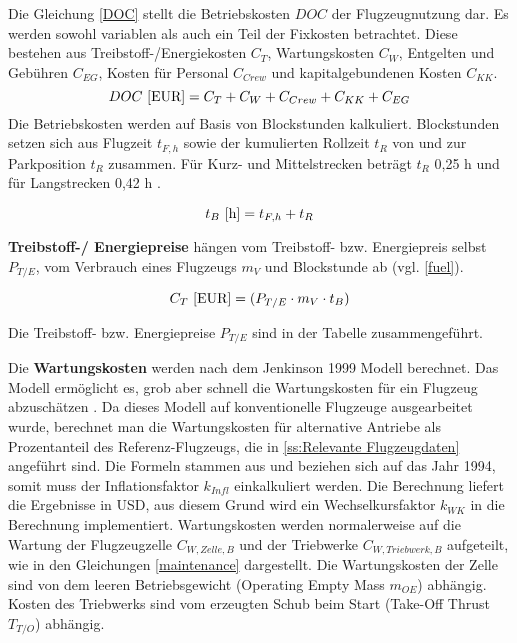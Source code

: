 Die Gleichung \eqref{DOC} stellt die Betriebskosten $DOC$ der Flugzeugnutzung dar. 
Es werden sowohl variablen als auch ein Teil der Fixkosten betrachtet.
Diese bestehen aus Treibstoff-/Energiekosten $C_T$, 
Wartungskosten $C_W$, Entgelten und Gebühren $C_{EG}$, 
Kosten für Personal $C_{Crew}$ und kapitalgebundenen Kosten $C_{KK}$.
%
\begin{equation}
     {DOC ~[\text{EUR}]} = C_T + C_W + C_{Crew} + C_{KK} + C_{EG} \\
     \label{DOC}
  \end{equation}
%
Die Betriebskosten werden auf Basis von Blockstunden kalkuliert. 
Blockstunden setzen sich aus Flugzeit $t_{F,h}$ sowie der kumulierten Rollzeit $t_{R}$ 
von und zur Parkposition $t_{R}$ zusammen. 
Für Kurz- und Mittelstrecken beträgt $t_{R}$ {0,25 h} und für Langstrecken 0,42 h \cite{scholz_design_evaluation_doc}.

\begin{equation}
   t_{B} ~[\text{h}] = t_{F,h} + t_{R} \\
   \label{blockzeit}
\end{equation}

\textbf{Treibstoff-/ Energiepreise} hängen vom Treibstoff- bzw. Energiepreis selbst $P_{T/E}$, 
vom Verbrauch eines Flugzeugs $m_{V}$ und Blockstunde ab (vgl. \eqref{fuel}).

\begin{equation}
   {C_T ~[\text{EUR}]} = (P_{T/E} \cdot m_{V} \cdot t_B) \\
   \label{fuel}
\end{equation}

Die Treibstoff- bzw. Energiepreise $P_{T/E}$ sind in der Tabelle zusammengeführt.

Die \textbf{Wartungskosten} werden nach dem Jenkinson 1999 Modell berechnet. 
Das Modell ermöglicht es, grob aber schnell die Wartungskosten 
für ein Flugzeug abzuschätzen \cite{bruge2018wartungskosten}.
Da dieses Modell auf konventionelle Flugzeuge ausgearbeitet wurde, 
berechnet man die Wartungskosten für alternative Antriebe als Prozentanteil des Referenz-Flugzeugs, 
die in \ref{ss:Relevante Flugzeugdaten} angeführt sind.
Die Formeln stammen aus \cite{bruge2018wartungskosten} und beziehen sich auf das Jahr 1994, 
somit muss der Inflationsfaktor $k_{Infl}$ einkalkuliert werden. 
Die Berechnung liefert die Ergebnisse in USD, 
aus diesem Grund wird ein Wechselkursfaktor $k_{WK}$ in die Berechnung implementiert.
Wartungskosten werden normalerweise auf die Wartung der Flugzeugzelle $C_{W,Zelle,B}$ 
und der Triebwerke $C_{W,Triebwerk,B}$ aufgeteilt, 
wie in den Gleichungen \eqref{maintenance} dargestellt. 
Die Wartungskosten der Zelle sind von dem leeren Betriebsgewicht 
(Operating Empty Mass $m_{OE}$) abhängig. 
Kosten des Triebwerks sind vom erzeugten Schub beim Start (Take-Off Thrust $T_{T/O}$) abhängig.


